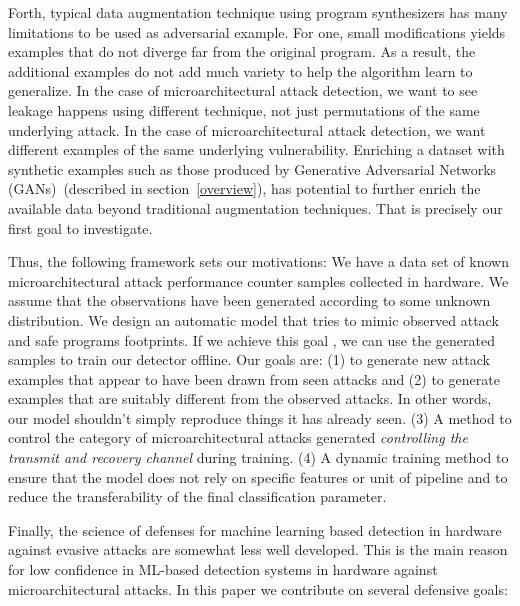 

Forth,  
typical data augmentation technique using program synthesizers has many limitations to be used as adversarial example. For one, small modifications yields examples that do not diverge far from the original program. As a result, the additional examples do not add much variety to help the algorithm learn to generalize. In the case of microarchitectural attack detection, we want to see leakage happens using different technique, not just permutations of the same underlying attack.
In the case of microarchitectural attack detection, we want different examples of the same underlying vulnerability. Enriching a dataset with synthetic examples such as those produced by Generative Adversarial Networks (GANs)~\cite{goodfellow2014generative}(described in section~\ref{overview}), has potential to further enrich the available data beyond traditional augmentation techniques. That is precisely our first goal to investigate. 

 
 Thus, the following framework sets our motivations:
  We have a data set of known   microarchitectural attack performance counter samples collected in hardware. 
 We assume that the observations have been generated according to some unknown distribution. 
 We design an automatic model that tries to mimic observed attack and safe programs footprints. If we achieve this goal , we can use the generated samples to train our detector offline. Our goals are: (1) to generate new attack examples that appear to have been drawn from seen attacks and (2) to generate examples that are suitably different from the observed attacks. In other words, our model shouldn't simply reproduce things it has already seen. (3) A method to control the category of microarchitectural attacks generated {\em controlling the transmit and recovery channel} during training. (4) A dynamic training method to ensure that the model does not rely on specific features or unit of pipeline and to reduce the  transferability of the final classification parameter. 
 
 
 
Finally, the science of defenses for machine learning based  detection in hardware against evasive attacks are somewhat less well developed. This is the main reason for low confidence in ML-based detection systems in hardware against microarchitectural attacks. In this paper we contribute on several defensive goals:

